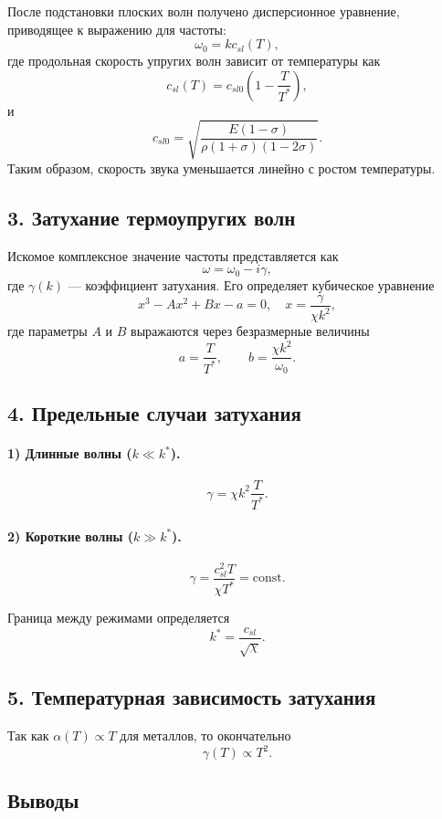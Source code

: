 После подстановки плоских волн получено дисперсионное уравнение, приводящее к выражению для частоты:
\[
\omega_0 = k c_{sl}(T),
\]
где продольная скорость упругих волн зависит от температуры как
\[
c_{sl}(T) = c_{sl0}\left(1 - \frac{T}{T^*}\right),
\]
и
\[
c_{sl0} = \sqrt{\frac{E(1-\sigma)}{\rho(1+\sigma)(1-2\sigma)}}.
\]
Таким образом, скорость звука уменьшается линейно с ростом температуры.

\subsection*{3. Затухание термоупругих волн}

Искомое комплексное значение частоты представляется как
\[
\omega = \omega_0 - i\gamma,
\]
где $\gamma(k)$ — коэффициент затухания.  
Его определяет кубическое уравнение
\[
x^3 - A x^2 + B x - a = 0,
\quad 
x = \frac{\gamma}{\chi k^2},
\]
где параметры $A$ и $B$ выражаются через безразмерные величины
\[
a = \frac{T}{T^*}, 
\qquad
b = \frac{\chi k^2}{\omega_0}.
\]

\subsection*{4. Предельные случаи затухания}

\paragraph{1) Длинные волны ($k \ll k^*$).}
\[
\gamma = \chi k^2 \frac{T}{T^*}.
\]

\paragraph{2) Короткие волны ($k \gg k^*$).}
\[
\gamma = \frac{c_{sl}^2 T}{\chi T^*} = \text{const}.
\]

Граница между режимами определяется
\[
k^* = \frac{c_{sl}}{\sqrt{\chi}}.
\]

\subsection*{5. Температурная зависимость затухания}

Так как $\alpha(T)\propto T$ для металлов, то окончательно
\[
\gamma(T) \propto T^2.
\]

\subsection*{Выводы}

